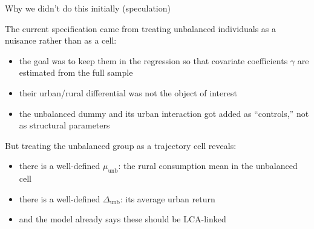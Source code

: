 \documentclass[10pt,aspectratio=169]{beamer}
\newcommand{\munb}{\mu_{\mathrm{unb}}}
\newcommand{\Deltaunb}{\Delta_{\mathrm{unb}}}
\begin{document}
\begin{frame}{Why we didn't do this initially (speculation)}

  The current specification came from treating unbalanced individuals as a nuisance rather than as a cell:

  \vspace{0.8em}
  \begin{itemize}
    \item the goal was to keep them in the regression so that covariate coefficients $\gamma$ are estimated from the full sample
    \item their urban/rural differential was not the object of interest
    \item the unbalanced dummy and its urban interaction got added as ``controls,'' not as structural parameters
  \end{itemize}

  \vspace{0.8em}
  But treating the unbalanced group as a trajectory cell reveals:

  \vspace{0.3em}
  \begin{itemize}
    \item there is a well-defined $\munb$: the rural consumption mean in the unbalanced cell
    \item there is a well-defined $\Deltaunb$: its average urban return
    \item and the model already says these should be LCA-linked
  \end{itemize}

\end{frame}
\end{document}
